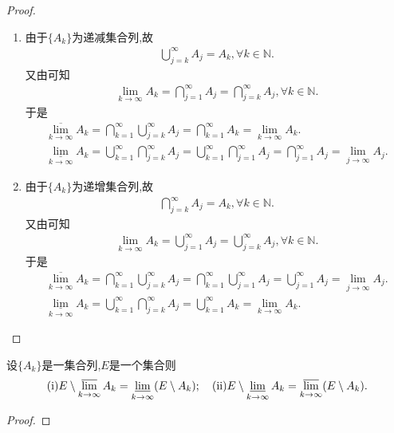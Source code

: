 \documentclass[../../main.tex]{subfiles}%
\begin{document}
\begin{proof}
\begin{enumerate}
\item 由于$\{A_k\}$为递减集合列,故
\begin{align*}
\bigcup_{j=k}^{\infty}{A_j}=A_k,\forall k\in \mathbb{N} .
\end{align*}
又由可知
\begin{align*}
\underset{k\rightarrow \infty}{\lim}A_k=\bigcap_{j=1}^{\infty}{A_j}=\bigcap_{j=k}^{\infty}{A_j},\forall k\in \mathbb{N} .
\end{align*}
于是
\begin{gather*}
\underset{k\rightarrow \infty}{\overline{\lim }}A_k=\bigcap_{k=1}^{\infty}{\bigcup_{j=k}^{\infty}{A_j}}=\bigcap_{k=1}^{\infty}{A_k}=\underset{k\rightarrow \infty}{\lim}A_k.
\\
\underset{k\rightarrow \infty}{\underline{\lim }}A_k=\bigcup_{k=1}^{\infty}{\bigcap_{j=k}^{\infty}{A_j}}=\bigcup_{k=1}^{\infty}{\bigcap_{j=1}^{\infty}{A_j}}=\bigcap_{j=1}^{\infty}{A_j}=\underset{j\rightarrow \infty}{\lim}A_j.
\end{gather*}

\item 由于$\{A_k\}$为递增集合列,故
\begin{align*}
\bigcap_{j=k}^{\infty}{A_j}=A_k,\forall k\in \mathbb{N} .
\end{align*}
又由可知
\begin{align*}
\underset{k\rightarrow \infty}{\lim}A_k=\bigcup_{j=1}^{\infty}{A_j}=\bigcup_{j=k}^{\infty}{A_j},\forall k\in \mathbb{N} .
\end{align*}
于是
\begin{gather*}
\underset{k\rightarrow \infty}{\overline{\lim }}A_k=\bigcap_{k=1}^{\infty}{\bigcup_{j=k}^{\infty}{A_j}}=\bigcap_{k=1}^{\infty}{\bigcup_{j=1}^{\infty}{A_j}}=\bigcup_{j=1}^{\infty}{A_j}=\underset{j\rightarrow \infty}{\lim}A_j.
\\
\underset{k\rightarrow \infty}{\underline{\lim }}A_k=\bigcup_{k=1}^{\infty}{\bigcap_{j=k}^{\infty}{A_j}}=\bigcup_{k=1}^{\infty}{A_k}=\underset{k\rightarrow \infty}{\lim}A_k.
\end{gather*}
\end{enumerate}
\end{proof}

\begin{proposition}[上、下极限集的性质]\label{proposition:上、下极限集的性质}
设\(\{A_k\}\)是一集合列,$E$是一个集合则
\begin{align*}
(\text{i}) E\setminus\varlimsup_{k\rightarrow\infty}A_k=\varliminf_{k\rightarrow\infty}(E\setminus A_k);\quad (\text{ii}) E\setminus\varliminf_{k\rightarrow\infty}A_k=\varlimsup_{k\rightarrow\infty}(E\setminus A_k).
\end{align*}
\end{proposition}
\begin{proof}

\end{proof}
\end{document}
